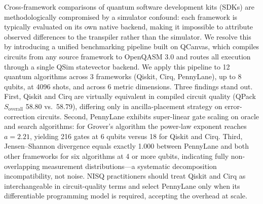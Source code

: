 Cross-framework comparisons of quantum software development kits (SDKs)
are methodologically compromised by a simulator confound: each framework
is typically evaluated on its own native backend, making it impossible
to attribute observed differences to the transpiler rather than the
simulator.
We resolve this by introducing a unified benchmarking pipeline built on
QCanvas, which compiles circuits from any source framework to OpenQASM
3.0 and routes all execution through a single QSim statevector backend.
We apply this pipeline to 12 quantum algorithms across 3 frameworks
(Qiskit, Cirq, PennyLane), up to 8 qubits, at 4096 shots, and across
6 metric dimensions.
Three findings stand out.
First, Qiskit and Cirq are virtually equivalent in compiled circuit
quality (QPack $S_{\text{overall}}$ 58.80 vs.\ 58.79), differing only
in ancilla-placement strategy on error-correction circuits.
Second, PennyLane exhibits super-linear gate scaling on oracle and
search algorithms: for Grover's algorithm the power-law exponent reaches
$a{=}2.21$, yielding 216 gates at 6 qubits versus 18 for Qiskit and
Cirq.
Third, Jensen--Shannon divergence equals exactly 1.000 between PennyLane
and both other frameworks for six algorithms at 4 or more qubits,
indicating fully non-overlapping measurement distributions---a
systematic decomposition incompatibility, not noise.
NISQ practitioners should treat Qiskit and Cirq as interchangeable in
circuit-quality terms and select PennyLane only when its differentiable
programming model is required, accepting the overhead at scale.

